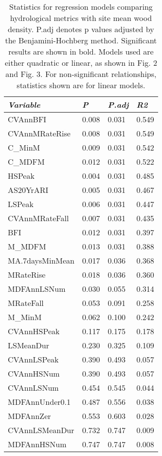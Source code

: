 \documentclass[12pt,a4paper]{memoir}
\begin{document}
\begin{table}[ht]
\tiny
\centering
\caption[Statistics for regression models.]{\small{Statistics for regression models comparing hydrological metrics with site mean wood density. P.adj denotes p values adjusted by the Benjamini-Hochberg method. Significant results are shown in bold. Models used are either quadratic or linear, as shown in Fig. 2 and Fig. 3. For non-significant relationships, statistics shown are for linear models.}}
\label{Ch5_T2}
{\tabulinesep=1.2mm
\begin{tabu}to \textwidth {XXXX}
\hline
\textit{Variable}          & \textit{P}     & \textit{P.adj} & \textit{R2}    \\ \hline
CVAnnBFI        & 0.008 & 0.031 & 0.549 \\
CVAnnMRateRise  & 0.008 & 0.031 & 0.549 \\
C\_MinM         & 0.009 & 0.031 & 0.542 \\
C\_MDFM         & 0.012 & 0.031 & 0.522 \\
HSPeak          & 0.004 & 0.031 & 0.485 \\
AS20YrARI       & 0.005 & 0.031 & 0.467 \\
LSPeak          & 0.006 & 0.031 & 0.447 \\
CVAnnMRateFall  & 0.007 & 0.031 & 0.435 \\
BFI             & 0.012 & 0.031 & 0.397 \\
M\_MDFM         & 0.013 & 0.031 & 0.388 \\
MA.7daysMinMean & 0.017 & 0.036 & 0.368 \\
MRateRise       & 0.018 & 0.036 & 0.360 \\
MDFAnnLSNum     & 0.030 & 0.055 & 0.314 \\
MRateFall       & 0.053 & 0.091 & 0.258 \\
M\_MinM         & 0.062 & 0.100 & 0.242 \\
CVAnnHSPeak     & 0.117 & 0.175 & 0.178 \\
LSMeanDur       & 0.230 & 0.325 & 0.109 \\
CVAnnLSPeak     & 0.390 & 0.493 & 0.057 \\
CVAnnHSNum      & 0.390 & 0.493 & 0.057 \\
CVAnnLSNum      & 0.454 & 0.545 & 0.044 \\
MDFAnnUnder0.1  & 0.487 & 0.556 & 0.038 \\
MDFAnnZer       & 0.553 & 0.603 & 0.028 \\
CVAnnLSMeanDur  & 0.732 & 0.747 & 0.009 \\
MDFAnnHSNum     & 0.747 & 0.747 & 0.008 \\[0.2cm] \hline
\end{tabu}}
\end{table}
\end{document}
